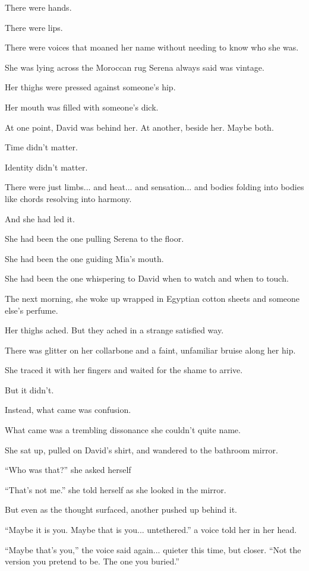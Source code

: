 There were hands. 

There were lips. 

There were voices that moaned her name without needing to know who she was.

She was lying across the Moroccan rug Serena always said was vintage. 

Her thighs were pressed against someone’s hip. 

Her mouth was filled with someone's dick.

At one point, David was behind her. At another, beside her. Maybe 
both. 

Time didn’t matter. 

Identity didn’t matter. 

There were just limbs... and heat... and sensation... and bodies folding 
into bodies like chords resolving into harmony.

And she had led it.

She had been the one pulling Serena to the floor. 

She had been the one guiding Mia’s mouth.

She had been the one whispering to David when to watch and when to touch.

The next morning, she woke up wrapped in Egyptian cotton sheets and someone else’s perfume. 

Her thighs ached. But they ached in a strange satisfied way. 

There was glitter on her collarbone and a faint, unfamiliar 
bruise along her hip. 

She traced it with her fingers and waited for the shame to arrive.

But it didn’t.

Instead, what came was confusion. 

What came was a trembling dissonance she couldn’t quite name.

She sat up, pulled on David’s shirt, and wandered to the bathroom mirror.

``Who was that?'' she asked herself

``That’s not me.'' she told herself as she looked in the mirror.

But even as the thought surfaced, another pushed up behind it.

``Maybe it is you. Maybe that is you... untethered.'' a voice told her in her head.

``Maybe that’s you,'' the voice said again... quieter this time, but closer. 
``Not the version you pretend to be. The one you buried.''

